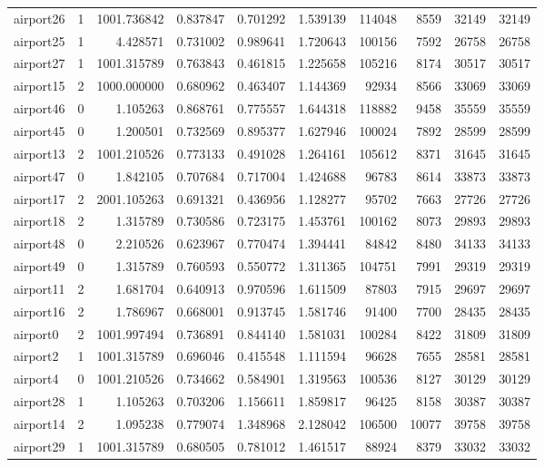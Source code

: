 \begin{longtable}{|l|r|r|r|r|r|r|r|r|r|}
airport26 & 1 & 1001.736842 & 0.837847 & 0.701292 & 1.539139 & 114048 & 8559 & 32149 & 32149 \\
airport25 & 1 & 4.428571 & 0.731002 & 0.989641 & 1.720643 & 100156 & 7592 & 26758 & 26758 \\
airport27 & 1 & 1001.315789 & 0.763843 & 0.461815 & 1.225658 & 105216 & 8174 & 30517 & 30517 \\
airport15 & 2 & 1000.000000 & 0.680962 & 0.463407 & 1.144369 & 92934 & 8566 & 33069 & 33069 \\
airport46 & 0 & 1.105263 & 0.868761 & 0.775557 & 1.644318 & 118882 & 9458 & 35559 & 35559 \\
airport45 & 0 & 1.200501 & 0.732569 & 0.895377 & 1.627946 & 100024 & 7892 & 28599 & 28599 \\
airport13 & 2 & 1001.210526 & 0.773133 & 0.491028 & 1.264161 & 105612 & 8371 & 31645 & 31645 \\
airport47 & 0 & 1.842105 & 0.707684 & 0.717004 & 1.424688 & 96783 & 8614 & 33873 & 33873 \\
airport17 & 2 & 2001.105263 & 0.691321 & 0.436956 & 1.128277 & 95702 & 7663 & 27726 & 27726 \\
airport18 & 2 & 1.315789 & 0.730586 & 0.723175 & 1.453761 & 100162 & 8073 & 29893 & 29893 \\
airport48 & 0 & 2.210526 & 0.623967 & 0.770474 & 1.394441 & 84842 & 8480 & 34133 & 34133 \\
airport49 & 0 & 1.315789 & 0.760593 & 0.550772 & 1.311365 & 104751 & 7991 & 29319 & 29319 \\
airport11 & 2 & 1.681704 & 0.640913 & 0.970596 & 1.611509 & 87803 & 7915 & 29697 & 29697 \\
airport16 & 2 & 1.786967 & 0.668001 & 0.913745 & 1.581746 & 91400 & 7700 & 28435 & 28435 \\
airport0 & 2 & 1001.997494 & 0.736891 & 0.844140 & 1.581031 & 100284 & 8422 & 31809 & 31809 \\
airport2 & 1 & 1001.315789 & 0.696046 & 0.415548 & 1.111594 & 96628 & 7655 & 28581 & 28581 \\
airport4 & 0 & 1001.210526 & 0.734662 & 0.584901 & 1.319563 & 100536 & 8127 & 30129 & 30129 \\
airport28 & 1 & 1.105263 & 0.703206 & 1.156611 & 1.859817 & 96425 & 8158 & 30387 & 30387 \\
airport14 & 2 & 1.095238 & 0.779074 & 1.348968 & 2.128042 & 106500 & 10077 & 39758 & 39758 \\
airport29 & 1 & 1001.315789 & 0.680505 & 0.781012 & 1.461517 & 88924 & 8379 & 33032 & 33032 \\

\end{longtable}
